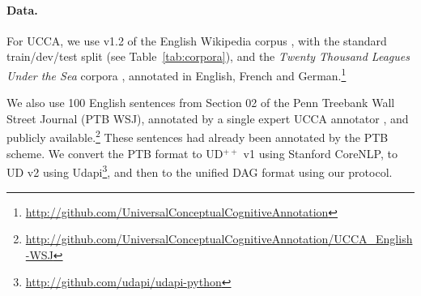 \documentclass[11pt,a4paper]{article}
\begin{document}
\paragraph{Data.}

For UCCA, we use v1.2 of the English Wikipedia corpus \cite{abend2013universal},
with the standard train/dev/test split (see Table~\ref{tab:corpora}),
and the \textit{Twenty Thousand Leagues Under the Sea} corpora
\cite{sulem2015conceptual},
annotated in English, French and German.\footnote{\url{http://github.com/UniversalConceptualCognitiveAnnotation}}

We also use 100 English sentences from Section 02 of the Penn Treebank Wall Street Journal
(PTB WSJ),
annotated by a single expert UCCA annotator \cite{hershcovich2018multitask},
and publicly available.\footnote{\url{http://github.com/UniversalConceptualCognitiveAnnotation/UCCA_English-WSJ}}
These sentences had already been annotated by the PTB scheme.
We convert the PTB format to UD$^{++}$ v1 using Stanford CoreNLP,
to UD v2 using Udapi\footnote{\url{http://github.com/udapi/udapi-python}},
and then to the unified DAG format using our protocol.
\end{document}
